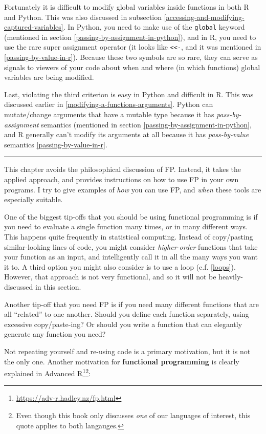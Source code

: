 \documentclass[
  12pt,
  krantz2]{krantz}
\renewcommand{\href}[2]{#2\footnote{\url{#1}}}
\begin{document}
Fortunately it is difficult to modify global variables inside functions in both R and Python. This was also discussed in subsection \ref{accessing-and-modifying-captured-variables}. In Python, you need to make use of the \texttt{global} keyword (mentioned in section \ref{passing-by-assignment-in-python}), and in R, you need to use the rare super assignment operator (it looks like \texttt{\textless{}\textless{}-}, and it was mentioned in \ref{passing-by-value-in-r}). Because these two symbols are so rare, they can serve as signals to viewers of your code about when and where (in which functions) global variables are being modified.

Last, violating the third criterion is easy in Python and difficult in R. This was discussed earlier in \ref{modifying-a-functions-arguments}. Python can mutate/change arguments that have a mutable type because it has \emph{pass-by-assignment} semantics (mentioned in section \ref{passing-by-assignment-in-python}, and R generally can't modify its arguments at all because it has \emph{pass-by-value} semantics \ref{passing-by-value-in-r}.

\begin{center}\rule{0.5\linewidth}{0.5pt}\end{center}

This chapter avoids the philosophical discussion of FP. Instead, it takes the applied approach, and provides instructions on how to use FP in your own programs. I try to give examples of \emph{how} you can use FP, and \emph{when} these tools are especially suitable.

One of the biggest tip-offs that you should be using functional programming is if you need to evaluate a single function many times, or in many different ways. This happens quite frequently in statistical computing. Instead of copy/pasting similar-looking lines of code, you might consider \emph{higher-order} functions that take your function as an input, and intelligently call it in all the many ways you want it to. A third option you might also consider is to use a loop (c.f. \ref{loops}). However, that approach is not very functional, and so it will not be heavily-discussed in this section.

Another tip-off that you need FP is if you need many different functions that are all ``related'' to one another. Should you define each function separately, using excessive copy/paste-ing? Or should you write a function that can elegantly generate any function you need?

Not repeating yourself and re-using code is a primary motivation, but it is not the only one. Another motivation for \textbf{functional programming} is clearly explained in \href{https://adv-r.hadley.nz/fp.html}{Advanced R}\footnote{Even though this book only discusses \emph{one} of our languages of interest, this quote applies to both langauges.}:
\end{document}
